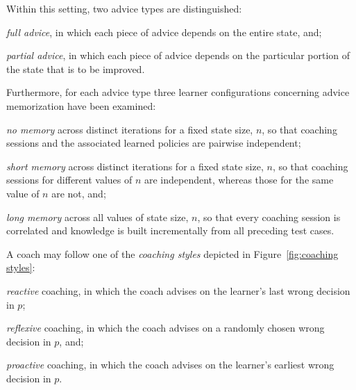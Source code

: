\documentclass[a4paper,twoside]{article}
\begin{document}
Within this setting, two advice types are distinguished:
\begin{enumerate*}[label=(A\arabic*)]
	\item \emph{full advice}, in which each piece of advice depends on the entire state, and;
	\item \emph{partial advice}, in which each piece of advice depends on the particular portion of the state that is to be improved.
\end{enumerate*}
Furthermore, for each advice type three learner configurations concerning advice memorization have been examined:
\begin{enumerate*}[label=(M\arabic*)]
	\item \emph{no memory} across distinct iterations for a fixed state size, $n$, so that coaching sessions and the associated learned policies are pairwise independent;
	\item \emph{short memory} across distinct iterations for a fixed state size, $n$, so that coaching sessions for different values of $n$ are independent, whereas those for the same value of $n$ are not, and;
	\item \emph{long memory} across all values of state size, $n$, so that every coaching session is correlated and knowledge is built incrementally from all preceding test cases.
\end{enumerate*}
A coach may follow one of the \emph{coaching styles} depicted in Figure~\ref{fig:coaching styles}:
\begin{enumerate*}[label=(C\arabic*)]
	\item \emph{reactive} coaching, in which the coach advises on the learner's last wrong decision in $p$;
	\item \emph{reflexive} coaching, in which the coach advises on a randomly chosen wrong decision in $p$, and;
	\item \emph{proactive} coaching, in which the coach advises on the learner's earliest wrong decision in $p$.
\end{enumerate*}
\end{document}
